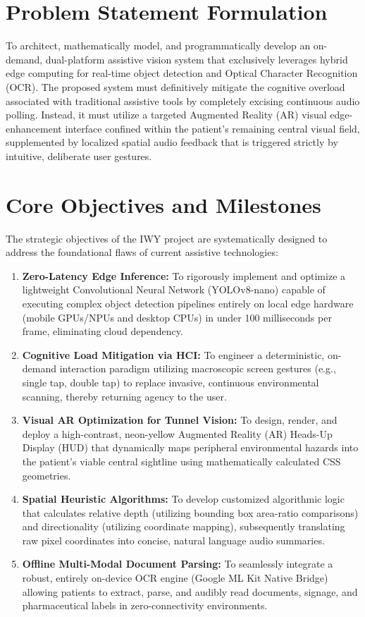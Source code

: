 \documentclass[12pt, a4paper]{report}
\begin{document}
\section{Problem Statement Formulation}
To architect, mathematically model, and programmatically develop an on-demand, dual-platform assistive vision system that exclusively leverages hybrid edge computing for real-time object detection and Optical Character Recognition (OCR). The proposed system must definitively mitigate the cognitive overload associated with traditional assistive tools by completely excising continuous audio polling. Instead, it must utilize a targeted Augmented Reality (AR) visual edge-enhancement interface confined within the patient's remaining central visual field, supplemented by localized spatial audio feedback that is triggered strictly by intuitive, deliberate user gestures.

\section{Core Objectives and Milestones}
The strategic objectives of the IWY project are systematically designed to address the foundational flaws of current assistive technologies:
\begin{enumerate}
    \item \textbf{Zero-Latency Edge Inference:} To rigorously implement and optimize a lightweight Convolutional Neural Network (YOLOv8-nano) capable of executing complex object detection pipelines entirely on local edge hardware (mobile GPUs/NPUs and desktop CPUs) in under 100 milliseconds per frame, eliminating cloud dependency.
    \item \textbf{Cognitive Load Mitigation via HCI:} To engineer a deterministic, on-demand interaction paradigm utilizing macroscopic screen gestures (e.g., single tap, double tap) to replace invasive, continuous environmental scanning, thereby returning agency to the user.
    \item \textbf{Visual AR Optimization for Tunnel Vision:} To design, render, and deploy a high-contrast, neon-yellow Augmented Reality (AR) Heads-Up Display (HUD) that dynamically maps peripheral environmental hazards into the patient's viable central sightline using mathematically calculated CSS geometries.
    \item \textbf{Spatial Heuristic Algorithms:} To develop customized algorithmic logic that calculates relative depth (utilizing bounding box area-ratio comparisons) and directionality (utilizing coordinate mapping), subsequently translating raw pixel coordinates into concise, natural language audio summaries.
    \item \textbf{Offline Multi-Modal Document Parsing:} To seamlessly integrate a robust, entirely on-device OCR engine (Google ML Kit Native Bridge) allowing patients to extract, parse, and audibly read documents, signage, and pharmaceutical labels in zero-connectivity environments.
\end{enumerate}
\end{document}
